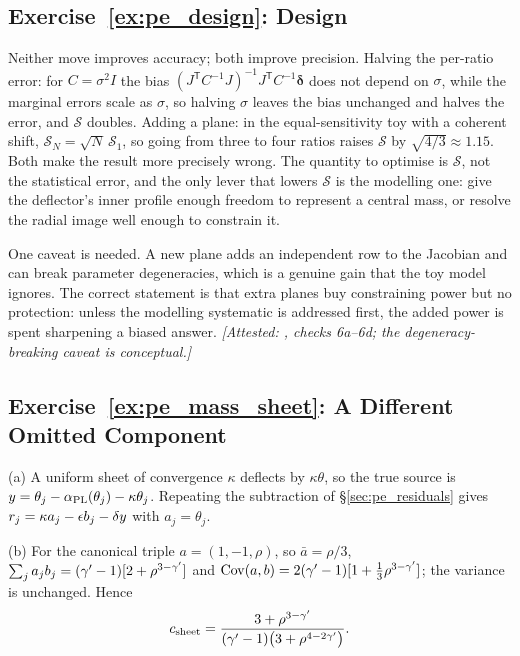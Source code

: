 \subsection*{Exercise~\ref{ex:pe_design}: Design}

Neither move improves accuracy; both improve precision. Halving the
per-ratio error: for $C=\sigma^2I$ the bias
$(J^{\mathsf T}C^{-1}J)^{-1}J^{\mathsf T}C^{-1}\boldsymbol\delta$
does not depend on $\sigma$, while the marginal errors scale as
$\sigma$, so halving $\sigma$ leaves the bias unchanged and halves the
error, and $\mathcal{S}$ doubles. Adding a plane: in the
equal-sensitivity toy with a coherent shift,
$\mathcal{S}_N=\sqrt N\,\mathcal{S}_1$, so going from three to four
ratios raises $\mathcal{S}$ by $\sqrt{4/3}\approx1.15$.
Both make the result more precisely wrong. The quantity to
optimise is $\mathcal{S}$, not the statistical error, and the only lever
that lowers $\mathcal{S}$ is the modelling one: give the deflector's
inner profile enough freedom to represent a central mass, or resolve the
radial image well enough to constrain it.

One caveat is needed. A new plane adds an
independent row to the Jacobian and can break parameter degeneracies,
which is a genuine gain that the toy model ignores. The correct
statement is that extra planes buy constraining power but no
protection: unless the modelling systematic is addressed first,
the added power is spent sharpening a biased answer.
\emph{[Attested: , checks 6a--6d; the degeneracy-breaking caveat is conceptual.]}

\subsection*{Exercise~\ref{ex:pe_mass_sheet}: A Different Omitted Component}

(a) A uniform sheet of convergence $\kappa$ deflects by
$\kappa\theta$, so the true source is
$y=\theta_j-\alpha_{\rm PL}(\theta_j)-\kappa\theta_j$. Repeating the
subtraction of \S\ref{sec:pe_residuals} gives
$r_j=\kappa a_j-\epsilon b_j-\delta y$ with $a_j=\theta_j$.

(b) For the canonical triple $a=(1,-1,\rho)$, so
$\bar a=\rho/3$, $\sum_ja_jb_j=(\gamma'-1)[2+\rho^{3-\gamma'}]$ and
$\operatorname{Cov}(a,b)=2(\gamma'-1)[1+\tfrac13\rho^{3-\gamma'}]$; the variance
is unchanged. Hence
\[
  c_{\rm sheet}=\frac{3+\rho^{3-\gamma'}}{(\gamma'-1)\bigl(3+\rho^{4-2\gamma'}\bigr)}.
\]

